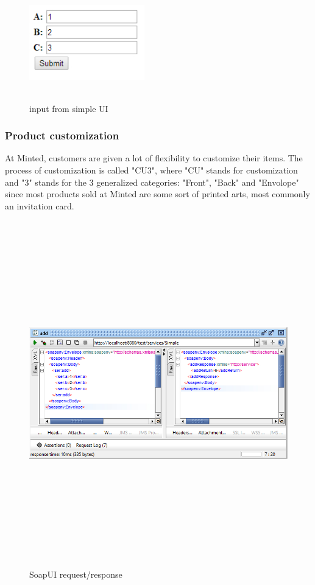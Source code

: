 \documentclass[12pt]{article}
\begin{document}
\begin{figure}[ht!]
\centering
\includegraphics[width=5cm,height=5cm,keepaspectratio]{img/ui.jpg}
\caption{input from simple UI}
\label{overflow}
\end{figure}

\subsubsection{Product customization}
At Minted, customers are given a lot of flexibility to customize their items. The process of customization is called "CU3", where "CU" stands for customization and "3" stands for the 3 generalized categories: "Front", "Back" and "Envolope" since most products sold at Minted are some sort of printed arts, most commonly an invitation card.\\
	
\begin{figure}[ht!]
\centering
\includegraphics[width=15cm,height=15cm,keepaspectratio]{img/soapui.jpg}
\caption{SoapUI request/response}
\label{overflow}
\end{figure}
\end{document}
